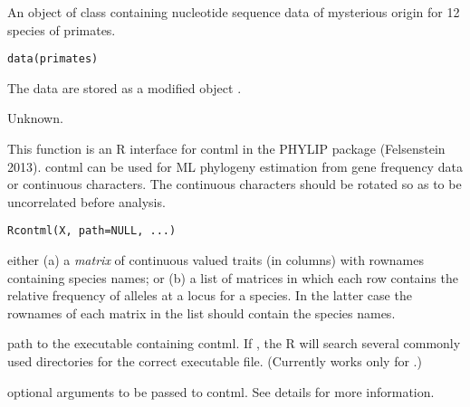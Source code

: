 \documentclass[a4paper]{book}
\begin{document}
%
\begin{Description}\relax
An object of class  containing nucleotide sequence data of mysterious origin for 12 species of primates.
\end{Description}
%
\begin{Usage}
\begin{verbatim}
data(primates)
\end{verbatim}
\end{Usage}
%
\begin{Format}
The data are stored as a modified object .
\end{Format}
%
\begin{Source}\relax
Unknown.
\end{Source}
%
\begin{Description}\relax
This function is an R interface for contml in the PHYLIP package (Felsenstein 2013). contml can be used for ML phylogeny estimation from gene frequency data or continuous characters. The continuous characters should be rotated so as to be uncorrelated before analysis.
\end{Description}
%
\begin{Usage}
\begin{verbatim}
Rcontml(X, path=NULL, ...)
\end{verbatim}
\end{Usage}
%
\begin{Arguments}
\begin{ldescription}
\item[\code{X}] either (a) a \emph{matrix} of continuous valued traits (in columns) with rownames containing species names; or (b) a list of matrices in which each row contains the relative frequency of alleles at a locus for a species. In the latter case the rownames of each matrix in the list should contain the species names.
\item[\code{path}] path to the executable containing contml. If , the R will search several commonly used directories for the correct executable file. (Currently works only for .)
\item[\code{...}] optional arguments to be passed to contml. See details for more information.
\end{ldescription}
\end{Arguments}
\end{document}
